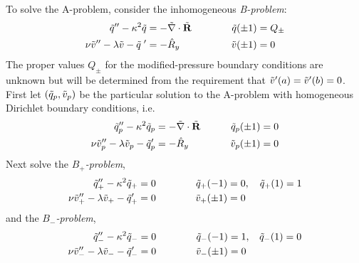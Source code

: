 \documentclass{article}[12pt]
\begin{document}
To solve the A-problem, consider the inhomogeneous {\em B-problem}:
\begin{alignat}{2}
\tilde{q}'' - \kappa^2 \tilde{q} &= - \tilde{\bf \nabla} \cdot \tilde{{\bf R}}  \qquad \quad & \tilde{q}(\pm 1) &= Q_{\pm} \label{q_B} \\
\nu \tilde{v}'' - \lambda \tilde{v} - \tilde{q}\;' &= -\hat{R}_y & \tilde{v}(\pm 1) &= 0 \label{v_B}
\end{alignat}
The proper values $Q_{\pm}$ for the modified-pressure boundary conditions
are unknown but will be determined from the requirement that $
\tilde{v}'(a) = \tilde{v}'(b) = 0$. First let $(\tilde{q}_p, \tilde{v}_p)$ be the particular
solution to the A-problem with homogeneous Dirichlet boundary conditions,
i.e.
\begin{alignat}{2}
\tilde{q}_p'' - \kappa^2 \tilde{q}_p &= - \tilde{\bf \nabla} \cdot \tilde{{\bf R}} \qquad
& \tilde{q}_p(\pm 1) &= 0 \label{q_p} \\
\nu \tilde{v}_p'' - \lambda \tilde{v}_p - \tilde{q}_p' &= -\hat{R}_y
& \tilde{v}_p(\pm 1) &= 0 \label{v_p}
\end{alignat}
Next solve the {\em $B_+$-problem},
\begin{alignat}{2}
\tilde{q}_+'' - \kappa^2 \tilde{q}_+ &= 0 \qquad \quad
& \tilde{q}_+(-1) &= 0, \quad \tilde{q}_+(1)= 1\label{q_B+} \\
\nu \tilde{v}_+'' - \lambda \tilde{v}_+ - \tilde{q}_+' &= 0
& \tilde{v}_+(\pm 1) &= 0 \label{v_B+}
\end{alignat}
and the {\em $B_-$-problem},
\begin{alignat}{2}
\tilde{q}_-'' - \kappa^2 \tilde{q}_- &= 0 \qquad \quad
& \tilde{q}_-(-1) &= 1, \:\:\:\: \tilde{q}_-(1) = 0\label{q_B-} \\
\nu \tilde{v}_-'' - \lambda \tilde{v}_- - \tilde{q}_-' &= 0
& \tilde{v}_-(\pm 1) &= 0 \label{v_B-}
\end{alignat}
\end{document}
